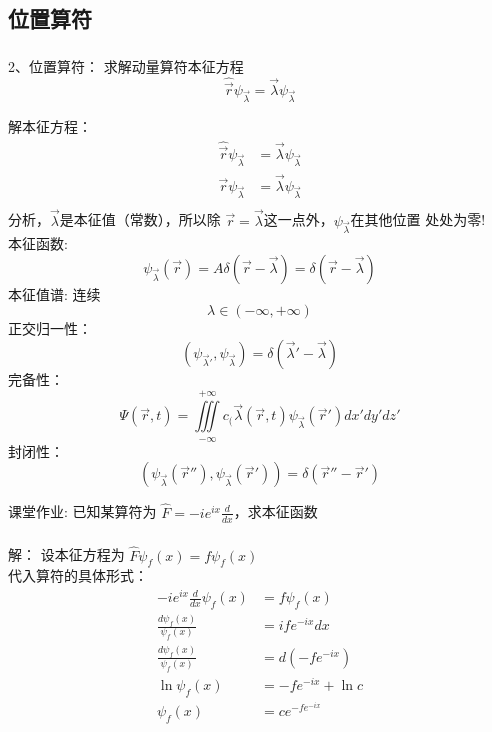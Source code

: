 \subsection{位置算符}

\begin{frame} [allowframebreaks=]
    \frametitle{}
    \frametitle{}
    \begin{tcolorbox1}{2、位置算符：}
    求解动量算符本征方程  
    \[\hat{\vec r}\psi_{\vec \lambda}=\vec \lambda \psi_{\vec \lambda}\]   
    \end{tcolorbox1}
    \alert{ 解本征方程：}  
    \begin{equation*}
        \begin{split}
            \hat{\vec r}\psi_{\vec \lambda}&=\vec \lambda \psi_{\vec \lambda} \\
            \vec{r}\psi_{\vec \lambda}&=\vec \lambda \psi_{\vec \lambda} \\
        \end{split} 
    \end{equation*}
    分析，$\vec \lambda$是本征值（常数），所以除 $\vec r =\vec \lambda $这一点外，$\psi_{\vec \lambda}$在其他位置
    处处为零!\\
    本征函数: $$ \psi_{\vec \lambda}(\vec{r})= A \delta(\vec{r}-\vec{\lambda})= \delta(\vec{r}-\vec{\lambda})$$
    本征值谱: 连续
        $$ \lambda \in (-\infty, +\infty) $$
    正交归一性：
        $$ (\psi_{\vec{\lambda}'}, \psi_{\vec{\lambda}}) =\delta(\vec{\lambda}'-\vec{\lambda})$$
    完备性：
    $$ \Psi(\vec{r},t)=\iiint\limits_{-\infty}^{+\infty}c_(\vec{\lambda}(\vec{r},t) \psi_{\vec{\lambda}}(\vec{r}') dx'dy'dz' $$
    封闭性：$$ (\psi_{\vec{\lambda}}(\vec{r}''), \psi_{\vec{\lambda}}(\vec{r}')) =\delta(\vec{r}''-\vec{r}')$$
\end{frame} 

\begin{frame} [allowframebreaks=]
    \begin{tcolorbox2}{课堂作业:}
        已知某算符为  $\hat{F}=-ie^{ix}\frac{d}{dx}$，求本征函数 \\  
     \end{tcolorbox2}
\end{frame} 

\begin{frame} [allowframebreaks=]
    \frametitle{}
    \alert{解：} 设本征方程为 $\hat{F}\psi_f(x)=f\psi_f(x)$\\
    代入算符的具体形式：
    \begin{equation*}
        \begin{split}
            -ie^{ix}\frac{d}{dx}\psi_f(x)&=f\psi_f(x) \\
            \frac{d\psi_f(x)}{\psi_f(x)}&=ife^{-ix} dx \\
            \frac{d\psi_f(x)}{\psi_f(x)}&=d(-fe^{-ix}) \\
           \ln{\psi_f(x)}&=-fe^{-ix}+\ln c \\
           \psi_f(x)&=c e^{-fe^{-ix}}
        \end{split} 
    \end{equation*}
\end{frame} 

